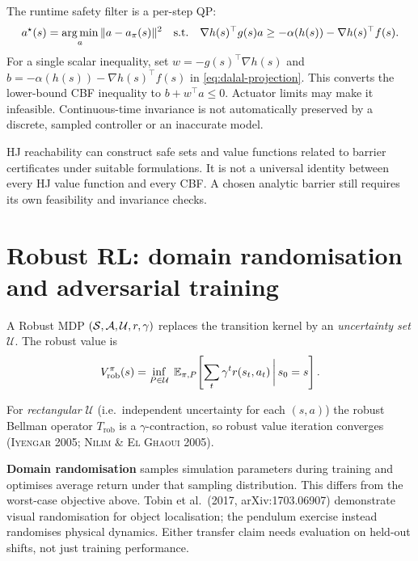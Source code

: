 \documentclass[11pt,oneside]{scrbook}
\begin{document}
The runtime safety filter is a per-step QP:
\begin{equation}\label{eq:cbf-qp}
   a^\star(s) = \operatorname*{arg\,min}_a \|a - a_\pi(s)\|^2
   \quad\text{s.t.}\quad \nabla h(s)^\top g(s) a \geq -\alpha(h(s)) - \nabla h(s)^\top f(s).
\end{equation}
For a single scalar inequality, set $w=-g(s)^\top\nabla h(s)$ and
$b=-\alpha(h(s))-\nabla h(s)^\top f(s)$ in
\cref{eq:dalal-projection}. This converts the lower-bound CBF inequality
to $b+w^\top a\leq0$. Actuator limits may make it infeasible.
Continuous-time invariance is not automatically preserved by a discrete,
sampled controller or an inaccurate model.

\begin{remark}
HJ reachability can construct safe sets and value functions related to
barrier certificates under suitable formulations. It is not a universal
identity between every HJ value function and every CBF. A chosen analytic
barrier still requires its own feasibility and invariance checks.
\end{remark}

\section{Robust RL: domain randomisation and adversarial training}

\begin{definition}\label{def:robust-mdp}
A Robust MDP $(\mathcal{S}, \mathcal{A}, \mathcal{U}, r, \gamma)$ replaces the
transition kernel by an \emph{uncertainty set} $\mathcal{U}$. The robust
value is
\[
   V^\pi_{\text{rob}}(s) = \inf_{P \in \mathcal{U}}\; \mathbb{E}_{\pi, P}\!\left[\sum_t \gamma^t r(s_t, a_t) \,\bigg|\, s_0 = s\right].
\]
\end{definition}

For \emph{rectangular} $\mathcal{U}$ (i.e.\ independent uncertainty for each
$(s, a)$) the robust Bellman operator $T_{\text{rob}}$ is a $\gamma$-contraction,
so robust value iteration converges (\textsc{Iyengar 2005}; \textsc{Nilim \&
El Ghaoui 2005}).

\textbf{Domain randomisation} samples simulation parameters during training
and optimises average return under that sampling distribution. This differs
from the worst-case objective above. Tobin et al.\ (2017,
arXiv:1703.06907) demonstrate visual randomisation for object localisation;
the pendulum exercise instead randomises physical dynamics. Either transfer
claim needs evaluation on held-out shifts, not just training performance.
\end{document}
